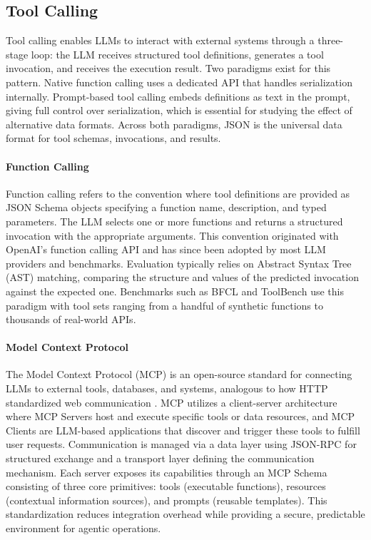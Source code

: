 \documentclass[11pt]{article}
\begin{document}
\subsection{Tool Calling}

Tool calling enables LLMs to interact with external systems through a three-stage loop: the LLM receives structured tool definitions, generates a tool invocation, and receives the execution result. Two paradigms exist for this pattern. Native function calling uses a dedicated API that handles serialization internally. Prompt-based tool calling embeds definitions as text in the prompt, giving full control over serialization, which is essential for studying the effect of alternative data formats. Across both paradigms, JSON is the universal data format for tool schemas, invocations, and results.

\paragraph{Function Calling}

Function calling refers to the convention where tool definitions are provided as JSON Schema objects specifying a function name, description, and typed parameters. The LLM selects one or more functions and returns a structured invocation with the appropriate arguments. This convention originated with OpenAI's function calling API and has since been adopted by most LLM providers and benchmarks. Evaluation typically relies on Abstract Syntax Tree (AST) matching, comparing the structure and values of the predicted invocation against the expected one. Benchmarks such as BFCL \citep{patil2023gorilla} and ToolBench \citep{qin2024toolllm} use this paradigm with tool sets ranging from a handful of synthetic functions to thousands of real-world APIs.

\paragraph{Model Context Protocol}

The Model Context Protocol (MCP) is an open-source standard for connecting LLMs to external tools, databases, and systems, analogous to how HTTP standardized web communication \citep{mcp2026}. MCP utilizes a client-server architecture where MCP Servers host and execute specific tools or data resources, and MCP Clients are LLM-based applications that discover and trigger these tools to fulfill user requests. Communication is managed via a data layer using JSON-RPC for structured exchange and a transport layer defining the communication mechanism. Each server exposes its capabilities through an MCP Schema consisting of three core primitives: tools (executable functions), resources (contextual information sources), and prompts (reusable templates). This standardization reduces integration overhead while providing a secure, predictable environment for agentic operations.
\end{document}

